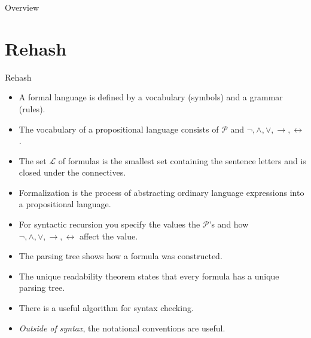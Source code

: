 \setcounter{framenumber}{128}
\begin{frame}
  \maketitle
\end{frame}

\begin{frame}{Overview}
\tableofcontents
\end{frame}

\section{Rehash}
\begin{frame}{Rehash}
	
 \begin{itemize}

	\item A formal language is defined by a vocabulary (symbols) and a grammar (rules).
	
	\item The vocabulary of a propositional language consists of $\mathcal{P}$ and $\neg,\land,\lor,\to,\leftrightarrow$.
	
	\item \alert{The set $\mathcal{L}$ of formulas is the smallest set containing the sentence letters and is closed under the connectives.} 
	
	\item Formalization is the process of abstracting ordinary language expressions into a propositional language.
	
	\item \alert{For syntactic recursion you specify the values the $\mathcal{P}$'s and how $\neg,\land,\lor,\to,\leftrightarrow$ affect the value.}
	
	\item \alert{The parsing tree shows how a formula was constructed.}
	
	\item The unique readability theorem states that every formula has a unique parsing tree.
	
	\item There is a useful algorithm for syntax checking.
	
	\item \alert{\emph{Outside of syntax}, the notational conventions are useful.}

\end{itemize}
	\end{frame}
		

